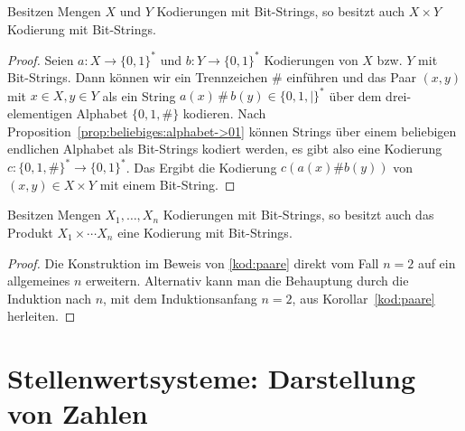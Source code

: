 \begin{prop} \label{kod:paare}
	Besitzen Mengen $X$ und $Y$ Kodierungen mit Bit-Strings, so besitzt auch $X \times Y$ Kodierung mit Bit-Strings. 
\end{prop} 
\begin{proof}
	Seien $ a : X \to \{0,1\}^\ast$ und $b : Y \to \{0,1\}^\ast$ Kodierungen von $X$ bzw. $Y$ mit Bit-Strings. Dann können wir ein Trennzeichen $\#$ einführen und das Paar $(x,y)$ mit $x \in X, y \in Y$ als ein String $a(x) \, \# \,  b(y) \in \{0,1,|\}^\ast$ über dem drei-elementigen Alphabet $\{0,1,\#\}$ kodieren. Nach Proposition~\ref{prop:beliebiges:alphabet->01} können Strings über einem beliebigen endlichen Alphabet als Bit-Strings kodiert werden, es gibt also eine Kodierung $c : \{0,1,\#\}^\ast \to \{0,1\}^\ast$. Das Ergibt die Kodierung $c ( a(x) \# b(y))$ von $(x,y) \in X \times Y$ mit einem Bit-String. 
\end{proof} 

\begin{kor}
	Besitzen Mengen $X_1,\ldots,X_n$ Kodierungen mit Bit-Strings, so besitzt auch das Produkt $X_1 \times \cdots X_n$ eine Kodierung mit Bit-Strings. 
\end{kor} 
\begin{proof} 
Die Konstruktion im Beweis von \eqref{kod:paare} direkt vom Fall $n=2$ auf ein allgemeines $n$ erweitern. Alternativ kann man die Behauptung durch die Induktion nach $n$, mit dem Induktionsanfang $n=2$, aus Korollar~\ref{kod:paare} herleiten. 
\end{proof} 


\section{Stellenwertsysteme: Darstellung von Zahlen}

